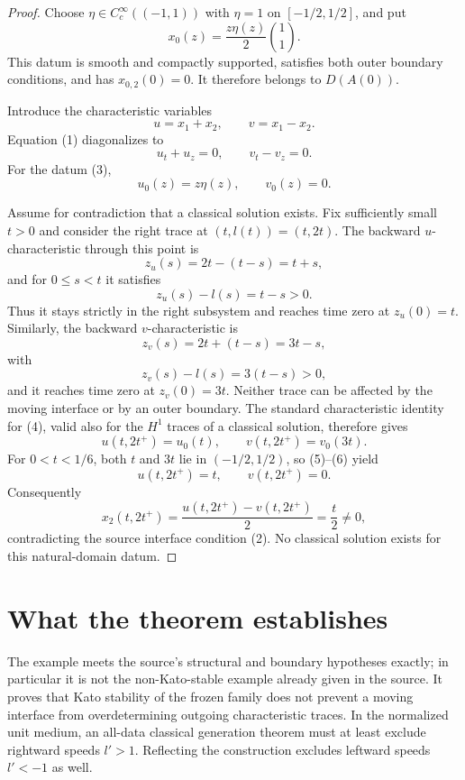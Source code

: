 \documentclass[11pt]{article}
\begin{document}
\begin{proof}
Choose $\eta\in C_c^\infty((-1,1))$ with $\eta=1$ on
$[-1/2,1/2]$, and put
\begin{equation}
 x_0(z)=\frac{z\eta(z)}2\binom{1}{1}.
\end{equation}
This datum is smooth and compactly supported, satisfies both outer boundary
conditions, and has $x_{0,2}(0)=0$.  It therefore belongs to $D(A(0))$.

Introduce the characteristic variables
\[
 u=x_1+x_2,\qquad v=x_1-x_2.
\]
Equation (1) diagonalizes to
\begin{equation}
 u_t+u_z=0,\qquad v_t-v_z=0.
\end{equation}
For the datum (3),
\begin{equation}
 u_0(z)=z\eta(z),\qquad v_0(z)=0.
\end{equation}

Assume for contradiction that a classical solution exists.  Fix sufficiently
small $t>0$ and consider the right trace at $(t,l(t))=(t,2t)$.  The backward
$u$-characteristic through this point is
\[
 z_u(s)=2t-(t-s)=t+s,
\]
and for $0\le s<t$ it satisfies
\[
 z_u(s)-l(s)=t-s>0.
\]
Thus it stays strictly in the right subsystem and reaches time zero at
$z_u(0)=t$.  Similarly, the backward $v$-characteristic is
\[
 z_v(s)=2t+(t-s)=3t-s,
\]
with
\[
 z_v(s)-l(s)=3(t-s)>0,
\]
and it reaches time zero at $z_v(0)=3t$.  Neither trace can be affected by
the moving interface or by an outer boundary.  The standard characteristic
identity for (4), valid also for the $H^1$ traces of a classical solution,
therefore gives
\begin{equation}
 u(t,2t^+)=u_0(t),\qquad v(t,2t^+)=v_0(3t).
\end{equation}
For $0<t<1/6$, both $t$ and $3t$ lie in $(-1/2,1/2)$, so (5)--(6) yield
\[
 u(t,2t^+)=t,\qquad v(t,2t^+)=0.
\]
Consequently
\[
 x_2(t,2t^+)=\frac{u(t,2t^+)-v(t,2t^+)}2=\frac t2\ne0,
\]
contradicting the source interface condition (2).  No classical solution
exists for this natural-domain datum.
\end{proof}

\section{What the theorem establishes}

The example meets the source's structural and boundary hypotheses exactly;
in particular it is not the non-Kato-stable example already given in the
source.  It proves that Kato stability of the frozen family does not prevent a
moving interface from overdetermining outgoing characteristic traces.  In the
normalized unit medium, an all-data classical generation theorem must at
least exclude rightward speeds $l'>1$.  Reflecting the construction excludes
leftward speeds $l'<-1$ as well.
\end{document}
